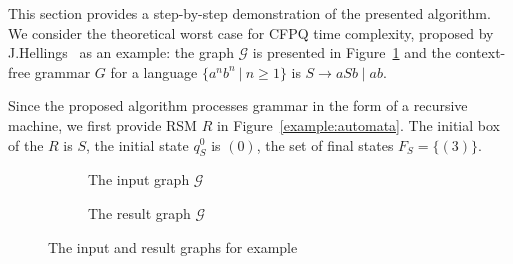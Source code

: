 This section provides a step-by-step demonstration of the presented algorithm.
We consider the theoretical worst case for CFPQ time complexity, proposed by J.Hellings~\cite{hellings2015querying} as an example: the graph $\mathcal{G}$ is presented in Figure~\ref{input:graph} and the context-free grammar $G$ for a language $\{a^n b^n~|~n \geq 1\}$ is $ S \to a S b \mid a b$.

Since the proposed algorithm processes grammar in the form of a recursive machine, we first provide RSM $R$ in Figure~\ref{example:automata}.
The initial box of the $R$ is $S$, the initial state $q_S^0$ is $(0)$, the set of final states $F_S = \{ (3) \}$.

\begin{figure}[h]
        \centering
        \begin{subfigure}{.48\textwidth}
        \begin{center}
        \caption{The input graph $\mathcal{G}$}
        \label{input:graph}
        \end{center}
        \end{subfigure}
        \begin{subfigure}{.48\textwidth}
        \begin{center}
    \caption{The result graph $\mathcal{G}$}
    \label{example:result}
    \end{center}
    \end{subfigure}
    \caption{The input and result graphs for example}
    \label{example:input_and_result}

\end{figure}

